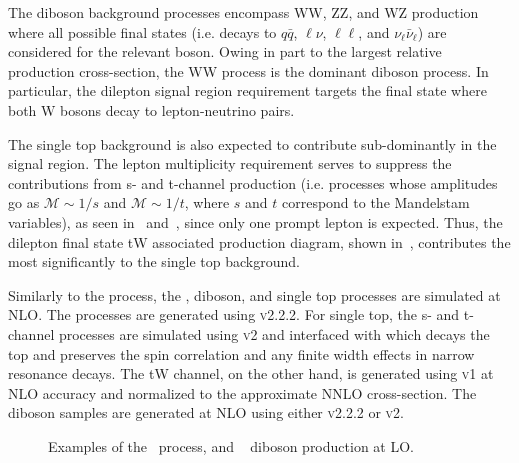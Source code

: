 The diboson background processes encompass WW, ZZ, and WZ production where all possible final states (i.e. decays to $q\bar{q}$, $\ell\nu$, $\ell\ell$, and $\nu_\ell\bar{\nu}_\ell$) are considered for the relevant boson. Owing in part to the largest relative production cross-section, the WW process is the dominant diboson process. In particular, the dilepton signal region requirement targets the final state where both W bosons decay to lepton-neutrino pairs. 
 
The single top background is also expected to contribute sub-dominantly in the signal region. The lepton multiplicity requirement serves to suppress the contributions from s- and t-channel production (i.e. processes whose amplitudes go as $\mathscr{M}\sim 1/s$ and $\mathscr{M}\sim 1/t$, where $s$ and $t$ correspond to the Mandelstam variables), as seen in~ and~, since only one prompt lepton is expected. Thus, the dilepton final state tW associated production diagram, shown in~, contributes the most significantly to the single top background.  

Similarly to the \ttll process, the \ttV, diboson, and single top processes are simulated at NLO. The \ttV processes are generated using \AMCATNLO \textsc{v2.2.2}. For single top, the s- and t-channel processes are simulated using \POWHEG \textsc{v2} and interfaced with \MadSpin which decays the top and preserves the spin correlation and any finite width effects in narrow resonance decays. The tW channel, on the other hand, is generated using \POWHEG \textsc{v1} at NLO accuracy and normalized to the approximate NNLO cross-section. The diboson samples are generated at NLO using either \AMCATNLO \textsc{v2.2.2} or \POWHEG \textsc{v2}.
 
\begin{figure}
  \begin{center}
    \hspace{1cm}
    \caption{Examples of the~\protect{} \ttV process, and ~\protect{} diboson production at LO.}
    \label{fig:diboson_feyn}
  \end{center}
\end{figure}


